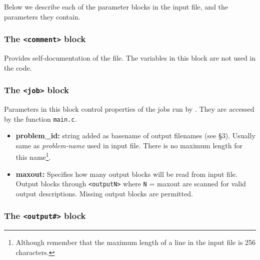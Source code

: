 Below we describe each of the parameter blocks in the input file,
and the parameters they contain.

\subsubsection{The {\tt <comment>} block}

Provides self-documentation of the file.  The variables in this block
are not used in the code.

\subsubsection{The {\tt <job>} block}

Parameters in this block control properties of the jobs run by \ath.
They are accessed by the function {\tt main.c}.
\begin{itemize}

\item {\bf problem\_id:}
string added as basename of output filenames (see \S 3).  Usually same
as {\it problem-name} used in input file.  There is no maximum length
for this name\footnote{Although remember that the maximum length of a
line in the input file is 256 characters.}.

\item {\bf maxout:} Specifies how many output blocks will be read from
input file.  Output
blocks {\tt<output1>} through {\tt<outputN>} where {\tt N} = maxout
are scanned for valid output descriptions.  Missing output
blocks are permitted.

\end{itemize}

\subsubsection{The {\tt <output\#>} block}

